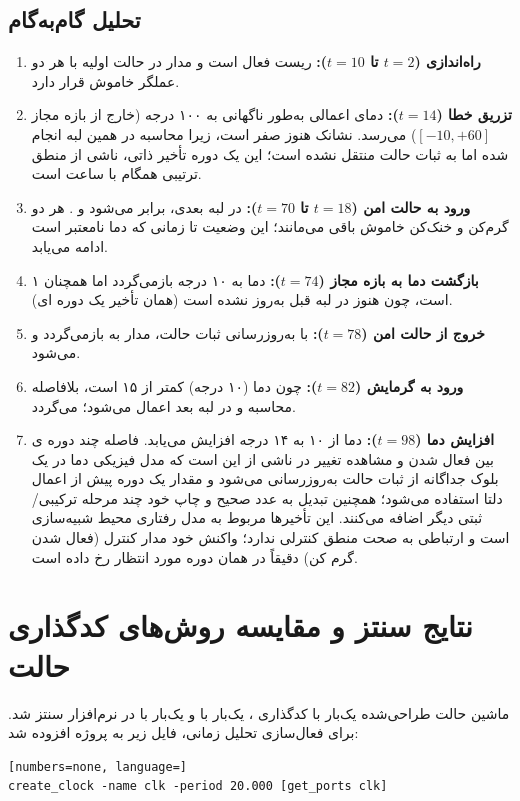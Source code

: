 \documentclass[11pt,a4paper]{article}
\begin{document}
\subsection{تحلیل گام‌به‌گام}
\begin{enumerate}
    \item \textbf{راه‌اندازی ($t=2$ تا $t=10$):} ریست فعال است و مدار در حالت اولیه  با هر دو عملگر خاموش قرار دارد.
    \item \textbf{تزریق خطا ($t=14$):} دمای اعمالی به‌طور ناگهانی به ۱۰۰ درجه (خارج از بازه مجاز $[-10,+60]$) می‌رسد. نشانک  هنوز صفر است، زیرا محاسبه  در همین لبه انجام شده اما به ثبات حالت منتقل نشده است؛ این یک دوره تأخیر ذاتی، ناشی از منطق ترتیبی همگام با ساعت است.
    \item \textbf{ورود به حالت امن ($t=18$ تا $t=70$):} در لبه بعدی،  برابر  می‌شود و . هر دو گرم‌کن و خنک‌کن خاموش باقی می‌مانند؛ این وضعیت تا زمانی که دما نامعتبر است ادامه می‌یابد.
    \item \textbf{بازگشت دما به بازه مجاز ($t=74$):} دما به ۱۰ درجه بازمی‌گردد اما  همچنان ۱ است، چون  هنوز در لبه قبل به‌روز نشده است (همان تأخیر یک دوره ای).
    \item \textbf{خروج از حالت امن ($t=78$):} با به‌روزرسانی ثبات حالت، مدار به  بازمی‌گردد و  می‌شود.
    \item \textbf{ورود به گرمایش ($t=82$):} چون دما (۱۰ درجه) کمتر از ۱۵ است، بلافاصله  محاسبه و در لبه بعد اعمال می‌شود؛  می‌گردد.
    \item \textbf{افزایش دما ($t=98$):} دما از ۱۰ به ۱۴ درجه افزایش می‌یابد. فاصله چند دوره ی بین فعال شدن  و مشاهده تغییر در  ناشی از این است که مدل فیزیکی دما  در یک بلوک  جداگانه از ثبات حالت به‌روزرسانی می‌شود و مقدار  یک دوره پیش از اعمال دلتا استفاده می‌شود؛ همچنین تبدیل  به عدد صحیح و چاپ  خود چند مرحله ترکیبی/ثبتی دیگر اضافه می‌کنند. این تأخیرها مربوط به مدل رفتاری محیط شبیه‌سازی است و ارتباطی به صحت منطق کنترلی  ندارد؛ واکنش خود مدار کنترل (فعال شدن گرم کن) دقیقاً در همان دوره مورد انتظار رخ داده است.
\end{enumerate}


\section{نتایج سنتز و مقایسه روش‌های کدگذاری حالت}
ماشین حالت طراحی‌شده یک‌بار با کدگذاری ، یک‌بار با  و یک‌بار با  در نرم‌افزار  سنتز شد. برای فعال‌سازی تحلیل زمانی، فایل  زیر به پروژه افزوده شد:
\begin{latin}
\begin{lstlisting}[numbers=none, language=]
create_clock -name clk -period 20.000 [get_ports clk]
\end{lstlisting}
\end{latin}
\end{document}

